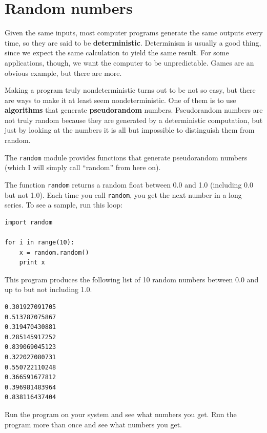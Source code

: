 \documentclass[10pt]{book}
\begin{document}
\section{Random numbers}


Given the same inputs, most computer programs generate the same
outputs every time, so they are said to be {\bf deterministic}.
Determinism is usually a good thing, since we expect the same
calculation to yield the same result.  For some applications, though,
we want the computer to be unpredictable.  Games are an obvious
example, but there are more.

Making a program truly nondeterministic turns out to be not so easy,
but there are ways to make it at least seem nondeterministic.  One of
them is to use {\bf algorithms} that generate {\bf pseudorandom} numbers.
Pseudorandom numbers are not truly random because they are generated
by a deterministic computation, but just by looking at the numbers it
is all but impossible to distinguish them from random.


The {\tt random} module provides functions that generate
pseudorandom numbers (which I will simply call ``random'' from
here on).


The function {\tt random} returns a random float
between 0.0 and 1.0 (including 0.0 but not 1.0).  Each time you
call {\tt random}, you get the next number in a long series.  To see a
sample, run this loop:

\beforeverb
\begin{verbatim}
import random

for i in range(10):
    x = random.random()
    print x
\end{verbatim}
\afterverb
%
This program produces the following list of 10 random numbers
between 0.0 and up to but not including 1.0.
\beforeverb
\begin{verbatim}
0.301927091705
0.513787075867
0.319470430881
0.285145917252
0.839069045123
0.322027080731
0.550722110248
0.366591677812
0.396981483964
0.838116437404
\end{verbatim}
\afterverb
%
\begin{ex}
Run the program on your system and see what numbers you get.
Run the program more than once and see what numbers you get.
\end{ex}
\end{document}
